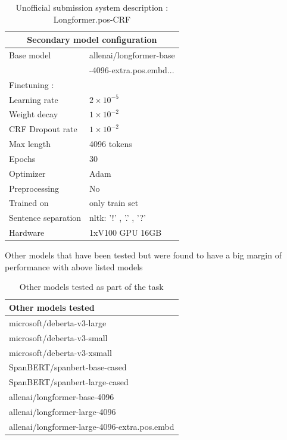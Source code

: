 \documentclass[11pt]{article}
\begin{document}
\begin{table}[!ht]
\centering
\begin{tabular}{|l|l|}
\hline
\multicolumn{2}{|c|}{Secondary model configuration} \\
\hline
Base model & allenai/longformer-base \\
& -4096-extra.pos.embd... \\
\hline
Finetuning : & \\
\hspace{2ex}Learning rate & $2 \times 10^{-5}$ \\
\hspace{2ex}Weight decay & $1 \times 10^{-2}$ \\
\hspace{2ex}CRF Dropout rate & $1 \times 10^{-2}$ \\
\hspace{2ex}Max length & 4096 tokens \\
\hspace{2ex}Epochs & 30 \\
\hspace{2ex}Optimizer & Adam \\
\hline
Preprocessing & No \\
\hline
Trained on & only train set \\
\hline
Sentence separation & nltk: '!' , '.' , '?' \\
\hline
Hardware & 1xV100 GPU 16GB\\
\hline
\end{tabular}
\caption{Unofficial submission system description : Longformer.pos-CRF}
\label{table:7}
\end{table}

Other models that have been tested but were found to have a big margin of performance with above listed models

\begin{table}[!ht]
\centering
\begin{tabular}{|l|}
\hline
Other models tested \\
\hline
microsoft/deberta-v3-large \\
microsoft/deberta-v3-small \\
microsoft/deberta-v3-xsmall \\
SpanBERT/spanbert-base-cased \\
SpanBERT/spanbert-large-cased \\
allenai/longformer-base-4096 \\
allenai/longformer-large-4096 \\
allenai/longformer-large-4096-extra.pos.embd \\
\hline
\end{tabular}
\caption{Other models tested as part of the task}
\label{table:8}
\end{table}
\end{document}
